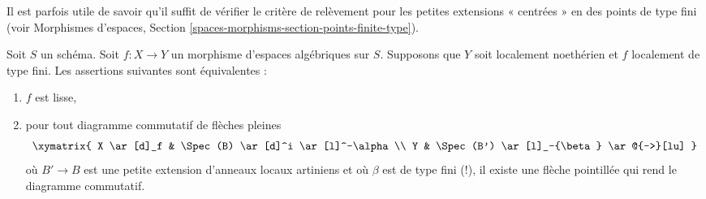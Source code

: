 \noindent
Il est parfois utile de savoir qu'il suffit de vérifier le
critère de relèvement pour les petites extensions « centrées » en des points
de type fini (voir
Morphismes d'espaces, Section \ref{spaces-morphisms-section-points-finite-type}).

\begin{lemma}
\label{lemma-lifting-along-artinian}
Soit $S$ un schéma. Soit $f : X \to Y$ un morphisme d'espaces algébriques
sur $S$. Supposons que $Y$ soit localement noethérien et $f$ localement de type fini.
Les assertions suivantes sont équivalentes :
\begin{enumerate}
\item $f$ est lisse,
\item pour tout diagramme commutatif de flèches pleines
$$
\xymatrix{
X \ar[d]_f & \Spec(B) \ar[d]^i \ar[l]^-\alpha \\
Y & \Spec(B') \ar[l]_-{\beta} \ar@{-->}[lu]
}
$$
où $B' \to B$ est une petite extension d'anneaux locaux artiniens
et où $\beta$ est de type fini (!), il existe une flèche pointillée qui rend
le diagramme commutatif.
\end{enumerate}
\end{lemma}

